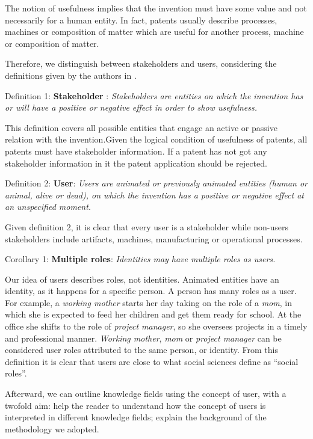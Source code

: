 \documentclass[]{book}
\begin{document}
The notion of usefulness implies that the invention must have some value
and not necessarily for a human entity. In fact, patents usually
describe processes, machines or composition of matter which are useful
for another process, machine or composition of matter.

Therefore, we distinguish between stakeholders and users, considering
the definitions given by the authors in \citep{bonam2017}.

Definition 1: \textbf{Stakeholder} : \emph{Stakeholders are entities on
which the invention has or will have a positive or negative effect in
order to show usefulness.}

This definition covers all possible entities that engage an active or
passive relation with the invention.Given the logical condition of
usefulness of patents, all patents must have stakeholder information. If
a patent has not got any stakeholder information in it the patent
application should be rejected.

Definition 2: \textbf{User}: \emph{Users are animated or previously
animated entities (human or animal, alive or dead), on which the
invention has a positive or negative effect at an unspecified moment.}

Given definition 2, it is clear that every user is a stakeholder while
non-users stakeholders include artifacts, machines, manufacturing or
operational processes.

Corollary 1: \textbf{Multiple roles}: \emph{Identities may have multiple
roles as users.}

Our idea of users describes roles, not identities. Animated entities
have an identity, as it happens for a specific person. A person has many
roles as a user. For example, a \emph{working mother} starts her day
taking on the role of a \emph{mom}, in which she is expected to feed her
children and get them ready for school. At the office she shifts to the
role of \emph{project manager}, so she oversees projects in a timely and
professional manner. \emph{Working mother}, \emph{mom} or \emph{project
manager} can be considered user roles attributed to the same person, or
identity. From this definition it is clear that users are close to what
social sciences define as ``social roles''.

Afterward, we can outline knowledge fields using the concept of user,
with a twofold aim: help the reader to understand how the concept of
users is interpreted in different knowledge fields; explain the
background of the methodology we adopted.
\end{document}
